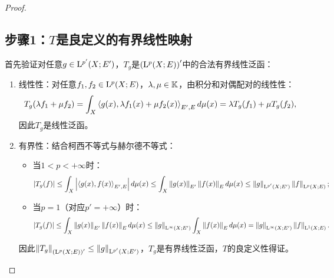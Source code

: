 \begin{proof}
\subsection{步骤1：$T$是良定义的有界线性映射}
首先验证对任意$g\in \mathrm{L}^{p'}(X;E')$，$T_g$是$\left(\mathrm{L}^{p}(X;E)\right)'$中的合法有界线性泛函：
\begin{enumerate}[label=(\arabic*), itemsep=0pt]
    \item 线性性：对任意$f_1,f_2\in \mathrm{L}^{p}(X;E)$，$\lambda,\mu\in\mathbb{K}$，由积分和对偶配对的线性性：
    $$
    T_g(\lambda f_1 + \mu f_2) = \int_X \left\langle g(x), \lambda f_1(x) + \mu f_2(x) \right\rangle_{E',E} d\mu(x) = \lambda T_g(f_1) + \mu T_g(f_2),
    $$
    因此$T_g$是线性泛函。
    \item 有界性：结合柯西不等式与赫尔德不等式：
    \begin{itemize}
        \item 当$1<p<+\infty$时：
        $$
        \left| T_g(f) \right| \leq \int_X \left|\left\langle g(x), f(x) \right\rangle_{E',E}\right| d\mu(x) \leq \int_X \left\| g(x) \right\|_{E'} \left\| f(x) \right\|_E d\mu(x) \leq \left\| g \right\|_{\mathrm{L}^{p'}(X;E')} \left\| f \right\|_{\mathrm{L}^{p}(X;E)};
        $$
        \item 当$p=1$（对应$p'=+\infty$）时：
        $$
        \left| T_g(f) \right| \leq \int_X \left\| g(x) \right\|_{E'} \left\| f(x) \right\|_E d\mu(x) \leq \left\| g \right\|_{\mathrm{L}^{\infty}(X;E')} \int_X \left\| f(x) \right\|_E d\mu(x) = \left\| g \right\|_{\mathrm{L}^{\infty}(X;E')} \left\| f \right\|_{\mathrm{L}^{1}(X;E)}.
        $$
    \end{itemize}
    因此$\left\| T_g \right\|_{\left(\mathrm{L}^{p}(X;E)\right)'} \leq \left\| g \right\|_{\mathrm{L}^{p'}(X;E')}$，$T_g$是有界线性泛函，$T$的良定义性得证。
\end{enumerate}


\end{proof}

